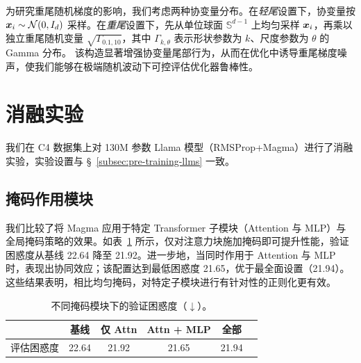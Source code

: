 \documentclass[11pt, a4paper, twocolumn, copyright, goog]{google}
\theoremstyle{plain}
\theoremstyle{definition}
\theoremstyle{remark}
\begin{document}
为研究重尾随机梯度的影响，我们考虑两种协变量分布。在\emph{轻尾}设置下，协变量按 ${\bm{x}}_i \sim \mathcal N(0,I_d)$ 采样。在\emph{重尾}设置下，先从单位球面 $\mathbb S^{d-1}$ 上均匀采样 ${\bm{x}}_i$，再乘以独立重尾随机变量 $\sqrt{\Gamma_{0.1,10}}$，其中 $\Gamma_{k,\theta}$ 表示形状参数为 $k$、尺度参数为 $\theta$ 的 Gamma 分布。 
该构造显著增强协变量尾部行为，从而在优化中诱导重尾梯度噪声，使我们能够在极端随机波动下可控评估优化器鲁棒性。

\section{消融实验} \label{appx:ablation_studies}
我们在 C4 数据集上对 130M 参数 Llama 模型（RMSProp+Magma）进行了消融实验，实验设置与 \S~\ref{subsec:pre-training-llms} 一致。

\subsection{掩码作用模块}
我们比较了将 Magma 应用于特定 Transformer 子模块（Attention 与 MLP）与全局掩码策略的效果。如表~\ref{table:masking-component} 所示，仅对注意力块施加掩码即可提升性能，验证困惑度从基线 22.64 降至 21.92。进一步地，当同时作用于 Attention 与 MLP 时，表现出协同效应；该配置达到最低困惑度 21.65，优于最全面设置（21.94）。这些结果表明，相比均匀掩码，对特定子模块进行有针对性的正则化更有效。

\begin{table} 
\caption{不同掩码模块下的验证困惑度（$\downarrow$）。}
\begin{center}
\begin{tabular}{lccccc}
\toprule
& 基线 & 仅 Attn & Attn + MLP & 全部 \\
\midrule
评估困惑度 & 22.64 & 21.92 & 21.65 & 21.94 \\
\bottomrule
\end{tabular}%
\end{center}
\label{table:masking-component}
\end{table}
\end{document}
